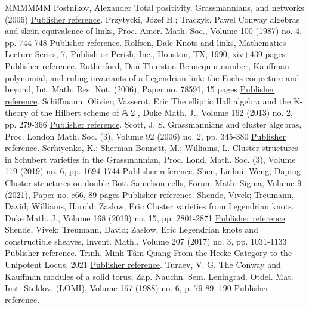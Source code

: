\begin{thebibliography}{MMMMMM}
 Postnikov, Alexander Total positivity, Grassmannians, and networks (2006) \href{https://alco.centre-mersenne.org/articles/10.5802/alco.345/#Pos}{Publisher reference}.
 Przytycki, Józef H.; Traczyk, Pawel Conway algebras and skein equivalence of links, Proc. Amer. Math. Soc., Volume 100 (1987) no. 4, pp. 744-748 \href{https://alco.centre-mersenne.org/articles/10.5802/alco.345/#PT}{Publisher reference}.
 Rolfsen, Dale Knots and links, Mathematics Lecture Series, 7, Publish or Perish, Inc., Houston, TX, 1990, xiv+439 pages \href{https://alco.centre-mersenne.org/articles/10.5802/alco.345/#Rolfsen}{Publisher reference}.
 Rutherford, Dan Thurston-Bennequin number, Kauffman polynomial, and ruling invariants of a Legendrian link: the Fuchs conjecture and beyond, Int. Math. Res. Not. (2006), Paper no. 78591, 15 pages \href{https://alco.centre-mersenne.org/articles/10.5802/alco.345/#Ruth}{Publisher reference}.
 Schiffmann, Olivier; Vasserot, Eric The elliptic Hall algebra and the K-theory of the Hilbert scheme of 𝔸 2 , Duke Math. J., Volume 162 (2013) no. 2, pp. 279-366 \href{https://alco.centre-mersenne.org/articles/10.5802/alco.345/#ScVa}{Publisher reference}.
 Scott, J. S. Grassmannians and cluster algebras, Proc. London Math. Soc. (3), Volume 92 (2006) no. 2, pp. 345-380 \href{https://alco.centre-mersenne.org/articles/10.5802/alco.345/#Scott}{Publisher reference}.
 Serhiyenko, K.; Sherman-Bennett, M.; Williams, L. Cluster structures in Schubert varieties in the Grassmannian, Proc. Lond. Math. Soc. (3), Volume 119 (2019) no. 6, pp. 1694-1744 \href{https://alco.centre-mersenne.org/articles/10.5802/alco.345/#SSBW}{Publisher reference}.
 Shen, Linhui; Weng, Daping Cluster structures on double Bott-Samelson cells, Forum Math. Sigma, Volume 9 (2021), Paper no. e66, 89 pages \href{https://alco.centre-mersenne.org/articles/10.5802/alco.345/#SW}{Publisher reference}.
 Shende, Vivek; Treumann, David; Williams, Harold; Zaslow, Eric Cluster varieties from Legendrian knots, Duke Math. J., Volume 168 (2019) no. 15, pp. 2801-2871 \href{https://alco.centre-mersenne.org/articles/10.5802/alco.345/#STWZ}{Publisher reference}.
 Shende, Vivek; Treumann, David; Zaslow, Eric Legendrian knots and constructible sheaves, Invent. Math., Volume 207 (2017) no. 3, pp. 1031-1133 \href{https://alco.centre-mersenne.org/articles/10.5802/alco.345/#STZ}{Publisher reference}.
 Trinh, Minh-Tâm Quang From the Hecke Category to the Unipotent Locus, 2021 \href{https://alco.centre-mersenne.org/articles/10.5802/alco.345/#Trinh}{Publisher reference}.
 Turaev, V. G. The Conway and Kauffman modules of a solid torus, Zap. Nauchn. Sem. Leningrad. Otdel. Mat. Inst. Steklov. (LOMI), Volume 167 (1988) no. 6, p. 79-89, 190 \href{https://alco.centre-mersenne.org/articles/10.5802/alco.345/#Turaev}{Publisher reference}.
\end{thebibliography}
